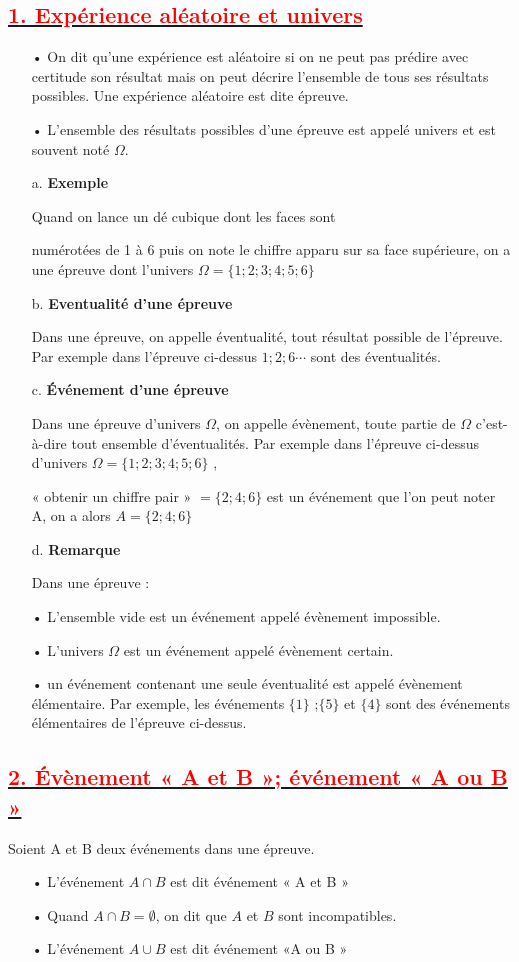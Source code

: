 \documentclass[12pt]{article}
\begin{document}
\subsection*{\underline{\textbf{\textcolor{red}{1. Expérience aléatoire et univers}}}}
\begin{enumerate}
\item[•]On dit qu’une expérience est aléatoire si on ne peut pas prédire avec certitude son résultat mais on peut décrire l’ensemble de tous ses résultats possibles. Une expérience aléatoire est dite épreuve.
\item[•]L’ensemble des résultats possibles d’une épreuve est appelé univers et est souvent noté $\Omega$.
\item[a.] \textbf{Exemple}

Quand on lance un dé cubique dont les faces sont

numérotées de 1 à 6 puis on note le chiffre apparu 
sur sa face supérieure, on a une épreuve dont l’univers $\Omega = \lbrace 1; 2; 3; 4; 5; 6\rbrace$
\item[b.] \textbf{Eventualité d’une épreuve}

Dans une épreuve, on appelle éventualité, tout résultat possible de l’épreuve. Par exemple dans 
l’épreuve ci-dessus $1 ; 2 ; 6\cdots $ sont des éventualités.
\item[c.] \textbf{ Événement d’une épreuve}

Dans une épreuve d’univers $\Omega$, on appelle évènement, toute partie de $\Omega$ c’est-à-dire tout ensemble d’éventualités. Par exemple dans l’épreuve ci-dessus d’univers
$\Omega= \lbrace1; 2; 3; 4; 5; 6\rbrace $ ,

« obtenir un chiffre pair » $= \lbrace2; 4; 6\rbrace $ est un événement que l’on peut noter A, on a alors 
$A = \lbrace 2; 4; 6\rbrace$

\item[d.] \textbf{Remarque}

Dans une épreuve :
\item[•] L’ensemble vide est un événement appelé évènement impossible.
\item[•] L’univers $\Omega$ est un événement appelé évènement certain.
\item[•] un événement contenant une seule éventualité est appelé évènement élémentaire. Par exemple, 
les événements $\lbrace 1\rbrace$ ;$\lbrace 5\rbrace$ et $\lbrace 4\rbrace$ sont des événements élémentaires de l’épreuve ci-dessus.
\end{enumerate}
\subsection*{\underline{\textbf{\textcolor{red}{2.  Évènement « A et B »; événement « A ou B »}}}}
Soient A et B deux événements dans une épreuve.
\begin{itemize}
\item[•] L’événement $A \cap B$ est dit événement « A et B » 
\item[•] Quand $A \cap B = \emptyset$, on dit que $A$ et $B$ sont incompatibles.
\item[•] L’événement $A \cup B$ est dit événement «A ou B »
\end{itemize}
\end{document}
